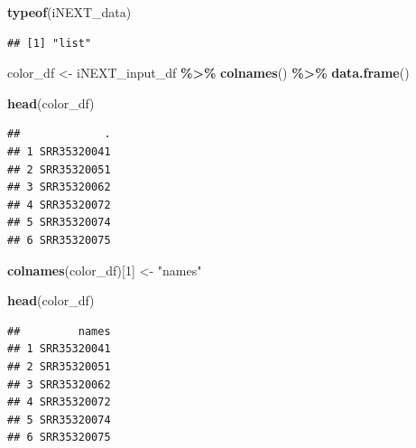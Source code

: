 \documentclass[
]{article}
\newenvironment{Shaded}{\begin{snugshade}}{\end{snugshade}}
\newcommand{\DecValTok}[1]{\textcolor[rgb]{0.00,0.00,0.81}{#1}}
\newcommand{\FunctionTok}[1]{\textcolor[rgb]{0.13,0.29,0.53}{\textbf{#1}}}
\newcommand{\NormalTok}[1]{#1}
\newcommand{\OtherTok}[1]{\textcolor[rgb]{0.56,0.35,0.01}{#1}}
\newcommand{\SpecialCharTok}[1]{\textcolor[rgb]{0.81,0.36,0.00}{\textbf{#1}}}
\newcommand{\StringTok}[1]{\textcolor[rgb]{0.31,0.60,0.02}{#1}}
\begin{document}
\begin{Shaded}
\begin{Highlighting}[]
\FunctionTok{typeof}\NormalTok{(iNEXT\_data)}
\end{Highlighting}
\end{Shaded}

\begin{verbatim}
## [1] "list"
\end{verbatim}

\begin{Shaded}
\begin{Highlighting}[]
\NormalTok{color\_df }\OtherTok{\textless{}{-}} 
\NormalTok{  iNEXT\_input\_df }\SpecialCharTok{\%\textgreater{}\%}
  \FunctionTok{colnames}\NormalTok{() }\SpecialCharTok{\%\textgreater{}\%}
  \FunctionTok{data.frame}\NormalTok{()}

\FunctionTok{head}\NormalTok{(color\_df)}
\end{Highlighting}
\end{Shaded}

\begin{verbatim}
##             .
## 1 SRR35320041
## 2 SRR35320051
## 3 SRR35320062
## 4 SRR35320072
## 5 SRR35320074
## 6 SRR35320075
\end{verbatim}

\begin{Shaded}
\begin{Highlighting}[]
\FunctionTok{colnames}\NormalTok{(color\_df)[}\DecValTok{1}\NormalTok{] }\OtherTok{\textless{}{-}} \StringTok{"names"}

\FunctionTok{head}\NormalTok{(color\_df)}
\end{Highlighting}
\end{Shaded}

\begin{verbatim}
##         names
## 1 SRR35320041
## 2 SRR35320051
## 3 SRR35320062
## 4 SRR35320072
## 5 SRR35320074
## 6 SRR35320075
\end{verbatim}
\end{document}
